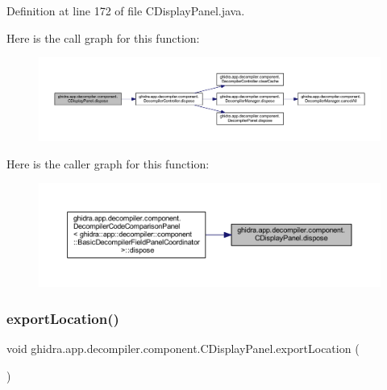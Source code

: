 Definition at line 172 of file C\+Display\+Panel.\+java.

Here is the call graph for this function\+:
\nopagebreak
\begin{figure}[H]
\begin{center}
\leavevmode
\includegraphics[width=350pt]{classghidra_1_1app_1_1decompiler_1_1component_1_1_c_display_panel_a41f19bb88aed7b6a4714a2ea905c2648_cgraph}
\end{center}
\end{figure}
Here is the caller graph for this function\+:
\nopagebreak
\begin{figure}[H]
\begin{center}
\leavevmode
\includegraphics[width=350pt]{classghidra_1_1app_1_1decompiler_1_1component_1_1_c_display_panel_a41f19bb88aed7b6a4714a2ea905c2648_icgraph}
\end{center}
\end{figure}
\mbox{\label{classghidra_1_1app_1_1decompiler_1_1component_1_1_c_display_panel_a68f0f8269debc8cc3aa8dd048dc42785}} 
\subsubsection{\texorpdfstring{exportLocation()}{exportLocation()}}
{\footnotesize\ttfamily void ghidra.\+app.\+decompiler.\+component.\+C\+Display\+Panel.\+export\+Location (\begin{DoxyParamCaption}{ }\end{DoxyParamCaption})\hspace{0.3cm}{\ttfamily [inline]}}



